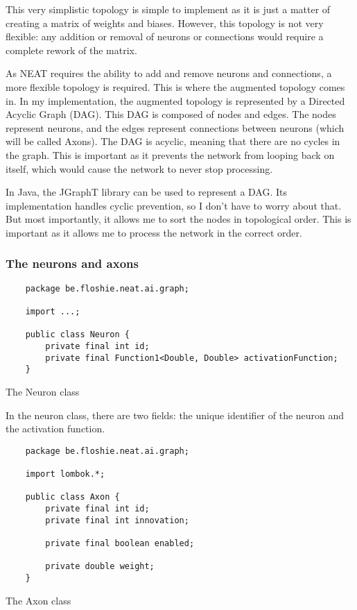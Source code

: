 \documentclass[a4paper, 12pt]{article}
\begin{document}
This very simplistic topology is simple to implement as it is just a matter of creating a matrix of weights and biases. However, this topology is not very flexible: any addition or removal of neurons or connections would require a complete rework of the matrix.

As NEAT requires the ability to add and remove neurons and connections, a more flexible topology is required. This is where the augmented topology comes in. In my implementation, the augmented topology is represented by a Directed Acyclic Graph (DAG). This DAG is composed of nodes and edges. The nodes represent neurons, and the edges represent connections between neurons (which will be called Axons). The DAG is acyclic, meaning that there are no cycles in the graph. This is important as it prevents the network from looping back on itself, which would cause the network to never stop processing.

In Java, the JGraphT library can be used to represent a DAG. Its implementation handles cyclic prevention, so I don't have to worry about that. But most importantly, it allows me to sort the nodes in topological order. This is important as it allows me to process the network in the correct order.

\subsubsection*{The neurons and axons}

\begin{listing}[H]
    \centering
    \begin{verbatim}
    package be.floshie.neat.ai.graph;
    
    import ...;

    public class Neuron {
        private final int id;
        private final Function1<Double, Double> activationFunction;
    }
    \end{verbatim}
    \caption{The Neuron class}
    \label{lst:neuron-class}
\end{listing}

In the neuron class, there are two fields: the unique identifier of the neuron and the activation function.

\begin{listing}[H]
    \centering
    \begin{verbatim}
    package be.floshie.neat.ai.graph;

    import lombok.*;

    public class Axon {
        private final int id;
        private final int innovation;

        private final boolean enabled;

        private double weight;
    }
    \end{verbatim}
    \caption{The Axon class}
    \label{lst:axon-class}
\end{listing}
\end{document}
